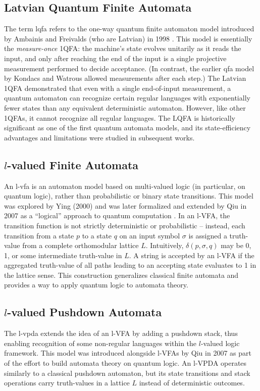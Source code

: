 \subsection{Latvian Quantum Finite Automata} 
The term \gls{lqfa} refers to the one-way quantum finite automaton model introduced by Ambainis and Freivalds (who are Latvian) in 1998 \cite{ambainis19981}. This model is essentially the \emph{measure-once} 1QFA: the machine’s state evolves unitarily as it reads the input, and only after reaching the end of the input is a single projective measurement performed to decide acceptance. (In contrast, the earlier \gls{qfa} model by Kondacs and Watrous allowed measurements after each step.) The Latvian 1QFA demonstrated that even with a single end-of-input measurement, a quantum automaton can recognize certain regular languages with exponentially fewer states than any equivalent deterministic automaton. However, like other 1QFAs, it cannot recognize all regular languages. The LQFA is historically significant as one of the first quantum automata models, and its state-efficiency advantages and limitations were studied in subsequent works.

\subsection{\texorpdfstring{$l$}{l}-valued Finite Automata} 
An \gls{l-vfa} is an automaton model based on multi-valued logic (in particular, on quantum logic), rather than probabilistic or binary state transitions. This model was explored by Ying (2000) and was later formalized and extended by Qiu in 2007 as a “logical” approach to quantum computation \cite{qiu2007automata}. In an l-VFA, the transition function is not strictly deterministic or probabilistic – instead, each transition from a state $p$ to a state $q$ on an input symbol $\sigma$ is assigned a truth-value from a complete orthomodular lattice $L$. Intuitively, $\delta(p,\sigma,q)$ may be 0, 1, or some intermediate truth-value in $L$. A string is accepted by an l-VFA if the aggregated truth-value of all paths leading to an accepting state evaluates to 1 in the lattice sense. This construction generalizes classical finite automata and provides a way to apply quantum logic to automata theory.

\subsection{\texorpdfstring{$l$}{l}-valued Pushdown Automata} 
The \gls{l-vpda} extends the idea of an l-VFA by adding a pushdown stack, thus enabling recognition of some non-regular languages within the $l$-valued logic framework. This model was introduced alongside l-VFAs by Qiu in 2007 \cite{qiu2007automata} as part of the effort to build automata theory on quantum logic. An l-VPDA operates similarly to a classical pushdown automaton, but its state transitions and stack operations carry truth-values in a lattice $L$ instead of deterministic outcomes.

